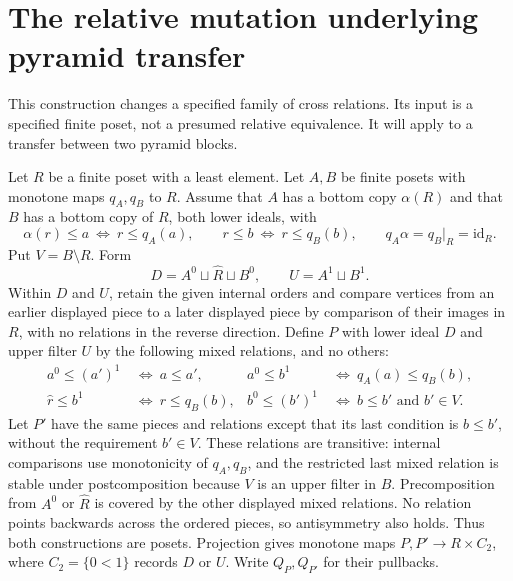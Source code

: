 \documentclass[11pt]{article}
\theoremstyle{definition}
\begin{document}
\section{The relative mutation underlying pyramid transfer}
\label{app:mutation}
This construction changes a specified family of cross relations.
Its input is a specified finite poset, not a presumed relative
equivalence. It will apply to a transfer between two pyramid blocks.

Let $R$ be a finite poset with a least element. Let $A,B$ be finite
posets with monotone maps $q_A,q_B$ to $R$. Assume that $A$ has a bottom copy
$\alpha(R)$ and that $B$ has a bottom copy of $R$, both lower ideals,
with
\[
 \alpha(r)\leq a\ \Longleftrightarrow\ r\leq q_A(a),\qquad
 r\leq b\ \Longleftrightarrow\ r\leq q_B(b),
 \qquad q_A\alpha=q_B|_R=\mathrm{id}_R.
\]
Put $V=B\setminus R$. Form
\[
 D=A^0\sqcup\widehat R\sqcup B^0,\qquad
 U=A^1\sqcup B^1.
\]
Within $D$ and $U$, retain the given internal orders and compare
vertices from an earlier displayed piece to a later displayed
piece by comparison of their images in $R$, with no relations in
the reverse direction. Define $P$ with lower ideal $D$ and upper filter $U$
by the following mixed relations, and no others:
\begin{align*}
 a^0\leq (a')^1&\ \Longleftrightarrow\ a\leq a',&
 a^0\leq b^1&\ \Longleftrightarrow\ q_A(a)\leq q_B(b),\\
 \widehat r\leq b^1&\ \Longleftrightarrow\ r\leq q_B(b),&
 b^0\leq (b')^1&\ \Longleftrightarrow\ b\leq b'\text{ and }b'\in V.
\end{align*}
Let $P'$ have the same pieces and relations except that its last
condition is $b\leq b'$, without the requirement $b'\in V$.
These relations are transitive: internal comparisons use monotonicity
of $q_A,q_B$, and the restricted last mixed relation is stable under
postcomposition because $V$ is an upper filter in $B$. Precomposition
from $A^0$ or $\widehat R$ is covered by the other displayed mixed
relations. No relation points backwards across the ordered pieces,
so antisymmetry also holds. Thus both constructions are posets.
Projection gives monotone maps
$P,P'\to R\times C_2$, where $C_2=\{0<1\}$ records $D$ or $U$.
Write $Q_P,Q_{P'}$ for their pullbacks.
\end{document}
